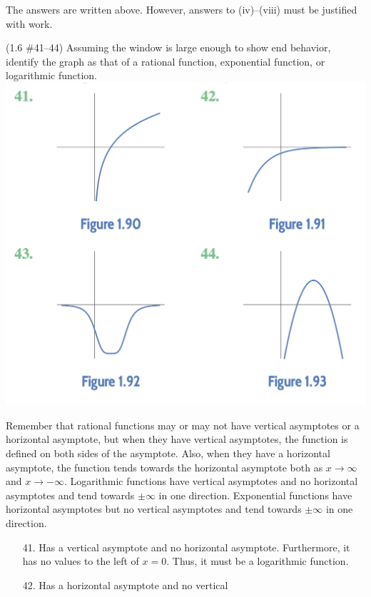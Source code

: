 \documentclass[11pt]{exam}
\begin{document}
\begin{questions}
\begin{solution}
  The answers are written above. However, answers to (iv)--(viii) must be
  justified with work.
\end{solution}
\question (1.6 \#41--44) Assuming the window is large enough to show
end behavior, identify the graph as that of a rational function,
exponential function, or logarithmic function.\\
\includegraphics[scale=0.5]{Figures/probs41-44.png}
\begin{solution}
  Remember that rational functions may or may not have vertical
  asymptotes or a horizontal asymptote, but when they have vertical
  asymptotes, the function is defined on both sides of the asymptote. Also, when they
  have a horizontal asymptote, the function tends towards the
  horizontal asymptote both as \(x\to\infty\) and \(x\to-\infty\). Logarithmic
  functions have vertical asymptotes and no horizontal
  asymptotes and tend towards \(\pm\infty\) in one direction. Exponential functions have horizontal asymptotes but no
  vertical asymptotes and tend towards \(\pm\infty\) in one direction.
  \begin{enumerate}
  \item[41.]  Has a vertical asymptote and no horizontal
    asymptote. Furthermore, it has no values to the left of
    \(x=0\). Thus, it must be a logarithmic function.
  \item[42.]  Has a horizontal asymptote and no vertical

\end{enumerate}
\end{solution}
\end{questions}
\end{document}
